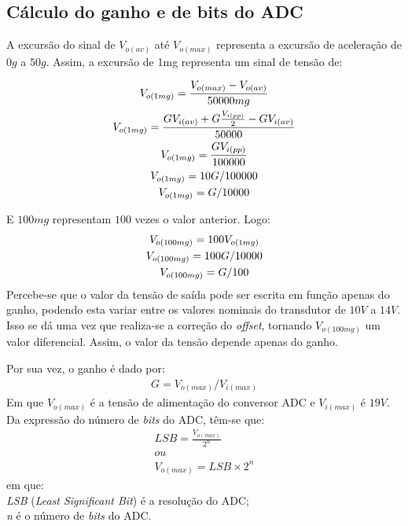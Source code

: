 \documentclass[
	12pt,				%
	openright,			%
	twoside,			%
	a4paper,			%
	english,			%
	french,				%
	spanish,			%
	brazil,				%
	]{abntex2}
\begin{document}
\begin{apendicesenv}

\partapendices

\chapter{Cálculo do ganho e de bits do ADC}
	\label{ape:calculoADC}

	A excursão do sinal de $V_{o(av)}$ até $V_{o(max)}$ representa a excursão de aceleração
	de $0g$ a $50g$. Assim, a excursão de 1mg representa um sinal de tensão de:

	\begin{gather*}
		V_{o(1mg)} = \frac{V_{o(max)} - V_{o(av)}}{50000mg}\\
		V_{o(1mg)} = \frac{G\*V_{i(av)} + G\*\frac{V_{i(pp)}}{2} - G\*V_{i(av)}}{50000}\\
		V_{o(1mg)} = \frac{G\*V_{i(pp)}}{100000}\\
		V_{o(1mg)} = 10\*G/100000\\
		V_{o(1mg)} = G/10000
	\end{gather*}

	E $100mg$ representam $100$ vezes o valor anterior. Logo:
	\begin{gather*}
		V_{o(100mg)} =100\*V_{o(1mg)}\\
		V_{o(100mg)} =100\*G/10000\\
		V_{o(100mg)} =G/100
	\end{gather*}
	Percebe-se que o valor da tensão de saída pode ser escrita em função apenas do ganho, podendo esta variar entre os valores nominais do transdutor	de $10V$ a $14V$. Isso se dá uma vez que realiza-se a correção do \textit{offset}, tornando $V_{o(100mg)}$ um valor diferencial. Assim, o valor da tensão depende apenas do ganho.

	Por sua vez, o ganho é dado por:
	\begin{gather*}
		G = V_{o(max)}/V_{i(max)}
	\end{gather*}
	Em que $V_{o(max)}$ é a tensão de alimentação do conversor ADC e $V_{i(max)}$ é
	$19V$. Da expressão do número de \textit{bits} do ADC, têm-se que:
	\begin{gather*}
		LSB = \frac{V_{o(max)}}{2^n}\\
		ou\\
		V_{o(max)} = LSB\times 2^n
	\end{gather*}
	em que:\\
	\textit{LSB} (\textit{Least Significant Bit}) é a resolução do ADC;\\
	\textit{n} é o número de \textit{bits} do ADC.\\


\end{apendicesenv}
\end{document}
